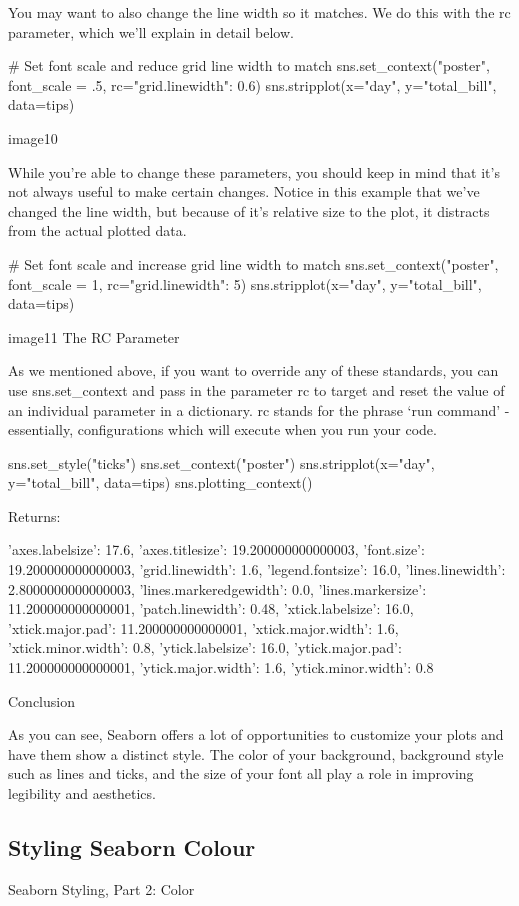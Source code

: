 \documentclass{journal}
\begin{document}
You may want to also change the line width so it matches. We do this with the rc parameter, which we’ll explain in detail below.

# Set font scale and reduce grid line width to match
sns.set_context("poster", font_scale = .5, rc={"grid.linewidth": 0.6})
sns.stripplot(x="day", y="total_bill", data=tips)

image10

While you’re able to change these parameters, you should keep in mind that it’s not always useful to make certain changes. Notice in this example that we’ve changed the line width, but because of it’s relative size to the plot, it distracts from the actual plotted data.

# Set font scale and increase grid line width to match
sns.set_context("poster", font_scale = 1, rc={"grid.linewidth": 5})
sns.stripplot(x="day", y="total_bill", data=tips)

image11
The RC Parameter

As we mentioned above, if you want to override any of these standards, you can use sns.set_context and pass in the parameter rc to target and reset the value of an individual parameter in a dictionary. rc stands for the phrase ‘run command’ - essentially, configurations which will execute when you run your code.

sns.set_style("ticks")
sns.set_context("poster")
sns.stripplot(x="day", y="total_bill", data=tips)
sns.plotting_context()

Returns:

{'axes.labelsize': 17.6,
 'axes.titlesize': 19.200000000000003,
 'font.size': 19.200000000000003,
 'grid.linewidth': 1.6,
 'legend.fontsize': 16.0,
 'lines.linewidth': 2.8000000000000003,
 'lines.markeredgewidth': 0.0,
 'lines.markersize': 11.200000000000001,
 'patch.linewidth': 0.48,
 'xtick.labelsize': 16.0,
 'xtick.major.pad': 11.200000000000001,
 'xtick.major.width': 1.6,
 'xtick.minor.width': 0.8,
 'ytick.labelsize': 16.0,
 'ytick.major.pad': 11.200000000000001,
 'ytick.major.width': 1.6,
 'ytick.minor.width': 0.8}

Conclusion

As you can see, Seaborn offers a lot of opportunities to customize your plots and have them show a distinct style. The color of your background, background style such as lines and ticks, and the size of your font all play a role in improving legibility and aesthetics.


\subsection{Styling Seaborn Colour}
Seaborn Styling, Part 2: Color
\end{document}

